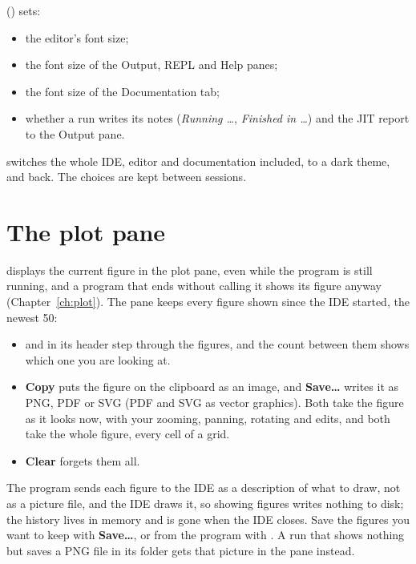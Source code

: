 \documentclass[11pt,a4paper,openany]{report}
\begin{document}
 () sets:

\begin{itemize}
\item the editor's font size;
\item the font size of the Output, REPL and Help panes;
\item the font size of the Documentation tab;
\item whether a run writes its notes (\emph{Running \ldots}, \emph{Finished in
  \ldots}) and the JIT report to the Output pane.
\end{itemize}

 switches the whole IDE, editor and documentation
included, to a dark theme, and back. The choices are kept between sessions.

\section{The plot pane}\label{sec:plotpane}

 displays the current figure in the plot pane, even while
the program is still running, and a program that ends without calling it shows
its figure anyway (Chapter~\ref{ch:plot}). The pane keeps every figure shown
since the IDE started, the newest 50:

\begin{itemize}
\item \textbf{\textleftarrow} and \textbf{\textrightarrow} in its header step
  through the figures, and the count between them shows which one you are
  looking at.
\item \textbf{Copy} puts the figure on the clipboard as an image, and
  \textbf{Save\ldots} writes it as PNG, PDF or SVG (PDF and SVG as vector
  graphics). Both take the figure as it looks now, with your zooming, panning,
  rotating and edits, and both take the whole figure, every cell of a grid.
\item \textbf{Clear} forgets them all.
\end{itemize}

The program sends each figure to the IDE as a description of what to draw,
not as a picture file, and the IDE draws it, so showing figures writes nothing
to disk; the history lives in memory and is gone when the IDE closes. Save the
figures you want to keep with \textbf{Save\ldots}, or from the program with
. A run that shows nothing but saves a PNG file in its folder
gets that picture in the pane instead.
\end{document}
